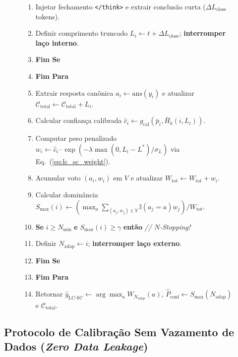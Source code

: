\documentclass[9pt,conference]{IEEEtran}
\begin{document}
\begin{figure}[t]
{\begin{minipage}{0.95\columnwidth}
\begin{enumerate}[label=\textbf{\arabic*:}, leftmargin=1.8em, itemsep=1.5pt]
    \item \quad \quad \quad Injetar fechamento \texttt{</think>} e extrair conclus\~{a}o curta ($\Delta L_{\text{close}}$ tokens).
    \item \quad \quad \quad Definir comprimento truncado $L_i \leftarrow t + \Delta L_{\text{close}}$; \textbf{interromper la\c{c}o interno}.
    \item \quad \quad \textbf{Fim Se}
    \item \quad \textbf{Fim Para}
    \item \quad Extrair resposta can\^{o}nica $a_i \leftarrow \text{ans}(y_i)$ e atualizar $\mathcal{C}_{\text{total}} \leftarrow \mathcal{C}_{\text{total}} + L_i$.
    \item \quad Calcular confian\c{c}a calibrada $\hat{c}_i \leftarrow g_{\text{cal}}(\bar{p}_i, \bar{H}_k(i, L_i))$.
    \item \quad Computar peso penalizado $w_i \leftarrow \hat{c}_i \cdot \exp\left(-\lambda \max(0, L_i - L^*)/\sigma_L\right)$ via Eq.~(\ref{eq:lc_sc_weight}).
    \item \quad Acumular voto $(a_i, w_i)$ em $V$ e atualizar $W_{\text{tot}} \leftarrow W_{\text{tot}} + w_i$.
    \item \quad Calcular domin\^{a}ncia $S_{\max}(i) \leftarrow \left(\max_{a} \sum_{(a_j, w_j) \in V} \mathbb{I}(a_j=a)w_j\right) / W_{\text{tot}}$.
    \item \quad \textbf{Se} $i \ge N_{\min}$ \textbf{e} $S_{\max}(i) \ge \gamma$ \textbf{ent\~{a}o} \hfill \textcolor{unbblue}{\textit{// $N$-Stopping!}}
    \item \quad \quad Definir $N_{\text{adap}} \leftarrow i$; \textbf{interromper la\c{c}o externo}.
    \item \quad \textbf{Fim Se}
    \item \textbf{Fim Para}
    \item Retornar $\hat{y}_{\text{LC-SC}} \leftarrow \arg\max_{a} W_{N_{\text{adap}}}(a)$, $\hat{P}_{\text{conf}} \leftarrow S_{\max}(N_{\text{adap}})$ e $\mathcal{C}_{\text{total}}$.
\end{enumerate}
\end{minipage}%
}
\end{figure}

\subsection{Protocolo de Calibra\c{c}\~{a}o Sem Vazamento de Dados (\textit{Zero Data Leakage})}
\end{document}
